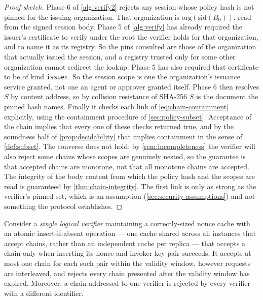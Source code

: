 \documentclass[11pt,a4paper]{article}
\begin{document}
\begin{proof}[Proof sketch]
Phase 6 of \cref{alg:verify2} rejects any session whose policy hash is
not pinned for the issuing organization. That organization is
$\mathrm{org}(\mathrm{sid}(B_0))$, read from the signed session body.
Phase 5 of \cref{alg:verify} has already required the issuer's
certificate to verify under the root the verifier holds for that
organization, and to name it as its registry. So the pins consulted are
those of the organization that actually issued the session, and a
registry trusted only for some other organization cannot redirect the
lookup. Phase 5 has also required that certificate to be of kind
\texttt{issuer}. So the session scope is one the organization's issuance
service granted, not one an agent or approver granted itself. Phase 6 then resolves $S$ by content
address, so by collision resistance of SHA-256 $S$ is the document the
pinned hash names. Finally it checks each link of
\cref{eq:chain-containment} explicitly, using the containment procedure
of \cref{sec:policy-subset}. Acceptance of the chain implies that every
one of these checks returned true, and by the soundness half of
\cref{prop:decidability} that implies containment in the sense of
\cref{def:subset}. The converse does not hold: by
\cref{rem:incompleteness} the verifier will also reject some chains
whose scopes are genuinely nested, so the guarantee is that accepted
chains are monotone, not that all monotone chains are accepted.
The integrity of the body content from which the policy hash and the
scopes are read is guaranteed by \cref{thm:chain-integrity}. The
first link is only as strong as the verifier's pinned set, which is an
assumption (\cref{sec:security-assumptions}) and not something the
protocol establishes.
\end{proof}

\begin{theorem}
\label{thm:replay}
Consider a \emph{single logical verifier} maintaining a correctly-sized
nonce cache with an atomic insert-if-absent operation --- one cache
shared across all instances that accept chains, rather than an
independent cache per replica --- that accepts a chain only when
inserting its nonce-and-invoker-key pair succeeds. It accepts at most
one chain for each such pair within the validity window, however
requests are interleaved, and rejects every chain presented after the
validity window has expired. Moreover, a chain addressed to one verifier
is rejected by every verifier with a different identifier.
\end{theorem}
\end{document}
